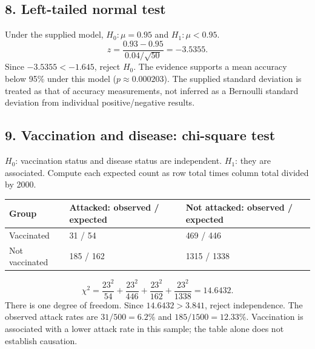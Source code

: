 \documentclass[11pt,a4paper]{article}
\begin{document}
\noindent\begin{minipage}{\linewidth}\subsection*{8. Left-tailed normal test}

Under the supplied model, $H_0:\mu=0.95$ and $H_1:\mu<0.95$.
\[z=\frac{0.93-0.95}{0.04/\sqrt{50}}=\boxed{-3.5355}.\]
Since $-3.5355<-1.645$, reject $H_0$. The evidence supports a mean accuracy below 95\% under this model ($p\approx0.000203$). The supplied standard deviation is treated as that of accuracy measurements, not inferred as a Bernoulli standard deviation from individual positive/negative results.
\end{minipage}\par\medskip
\noindent\begin{minipage}{\linewidth}\subsection*{9. Vaccination and disease: chi-square test}

$H_0$: vaccination status and disease status are independent. $H_1$: they are associated. Compute each expected count as row total times column total divided by 2000.
\begin{center}\renewcommand{\arraystretch}{1.2}\begin{tabular}{lll}\hline Group & Attacked: observed / expected & Not attacked: observed / expected\\\hline
Vaccinated & 31 / 54 & 469 / 446\\
Not vaccinated & 185 / 162 & 1315 / 1338\\\hline\end{tabular}\end{center}
\[\chi^2=\frac{23^2}{54}+\frac{23^2}{446}+\frac{23^2}{162}+\frac{23^2}{1338}
=\boxed{14.6432}.\]
There is one degree of freedom. Since $14.6432>3.841$, reject independence. The observed attack rates are $31/500=6.2\%$ and $185/1500=12.33\%$. Vaccination is associated with a lower attack rate in this sample; the table alone does not establish causation.
\end{minipage}\par\medskip
\end{document}
